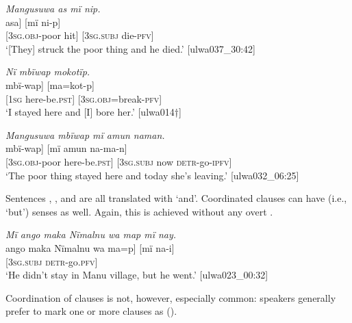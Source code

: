 \ea%
    \label{ex:complex:24}
          \textit{Mangusuwa as mï nip.}\\
\gll    {[ma-ngusuwa}  {asa]}  {[mï}      {ni-p]}\\
    {[3\textsc{sg.obj-}poor}  {hit]}    {[\textsc{3sg.subj}}  {die-\textsc{pfv]}}\\
\glt `[They] struck the poor thing and he died.’ [ulwa037\_30:42]
\z

\ea%
    \label{ex:complex:25}
          \textit{Nï mbïwap mokotïp.}\\
\gll    {[nï}    {mbï-wap]}    {[ma=kot-p]}\\
    {[1\textsc{sg}}  here-be.\textsc{pst]}  {[3\textsc{sg.obj}=break-\textsc{pfv]}}\\
\glt `I stayed here and [I] bore her.’ [ulwa014†]
\z

\ea%
    \label{ex:complex:26}
          \textit{Mangusuwa mbïwap mï amun naman.}\\
\gll    {[ma-ngusuwa}  {mbï-wap]}    {[mï}      amun  {na-ma-n]}\\
    {[3\textsc{sg.obj-}poor}  here-be.\textsc{pst]}  {[3\textsc{sg.subj}}  now  \textsc{detr-}go-\textsc{ipfv]}\\
\glt `The poor thing stayed here and today she’s leaving.’ [ulwa032\_06:25]
\z

Sentences , , and  are all translated with ‘and’. Coordinated clauses can have   (i.e., ‘but’) senses as well. Again, this is achieved without any overt  .

\ea%
    \label{ex:complex:27}
          \textit{Mï ango maka Nïmalnu wa map mï nay.}\\
\gll    {[mï}      ango  maka  Nïmalnu  wa    {ma=p]}      {[mï} {na-i]}\\
    [3\textsc{sg.subj}  \textsc{neg}  thus  Manu    village  \textsc{3sg.obj}=be]  \textsc{[3sg.subj}    \textsc{detr-}go.\textsc{pfv]}\\
\glt `He didn’t stay in Manu village, but he went.’ [ulwa023\_00:32]
\z


Coordination of clauses is not, however, especially common: speakers generally prefer to mark one or more clauses as  ().


